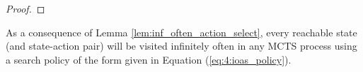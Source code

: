 \begin{proof}



    \end{proof}



    \proofsep



    

    

    As a consequence of Lemma \ref{lem:inf_often_action_select}, every reachable state (and state-action pair) will be visited infinitely often in any MCTS process using a search policy of the form given in Equation (\ref{eq:4:ioas_policy}).

